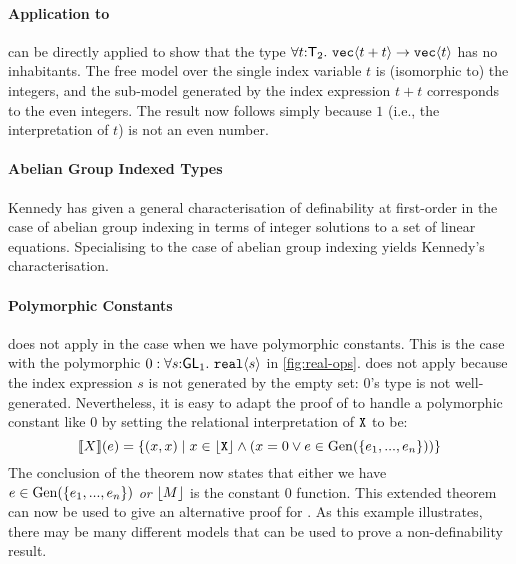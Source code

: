 
\paragraph{Application to }
 can be directly applied to show that the
type $\forall t\mathord:\mathsf{T}_2.~\textup{\texttt{vec}}\langle t + t \rangle \to
\textup{\texttt{vec}}\langle t \rangle$ has no inhabitants. The free model over the single
index variable $t$ is (isomorphic to) the integers, and the sub-model
generated by the index expression $t + t$ corresponds to the even
integers. The result now follows simply because $1$ (i.e., the
interpretation of $t$) is not an even number.

\paragraph{Abelian Group Indexed Types} Kennedy
\cite{kennedy97relational} has given a general characterisation of
definability at first-order in the case of abelian group indexing in
terms of integer solutions to a set of linear equations. Specialising
 to the case of abelian group indexing
yields Kennedy's characterisation.

\paragraph{Polymorphic Constants}  does not
apply in the case when we have polymorphic constants. This is the case
with the polymorphic $0 : \forall
s\mathord:\mathsf{GL}_1.~\textup{\texttt{real}}\langle s \rangle$ in
\autoref{fig:real-ops}.  does not apply
because the index expression $s$ is not generated by the empty set:
$0$'s type is not well-generated. Nevertheless, it is easy to adapt
the proof of  to handle a polymorphic
constant like $0$ by setting the relational interpretation of
$\textup{\texttt{X}}$ to be:
\begin{displaymath}
  \llbracket X \rrbracket(e) = \{ (x,x) \mathrel| x \in \left\lfloor \textup{\texttt{X}} \right\rfloor \land (x = 0 \lor e \in \mathrm{Gen}(\{e_1,...,e_n\})) \}
\end{displaymath}
The conclusion of the theorem now states that either we have $e \in
\mathrm{Gen}(\{e_1,...,e_n\})$ \emph{or} $\left\lfloor{M}\right\rfloor$ is the constant $0$
function. This extended theorem can now be used to give an alternative
proof for . As this example illustrates,
there may be many different models that can be used to prove a
non-definability result.

